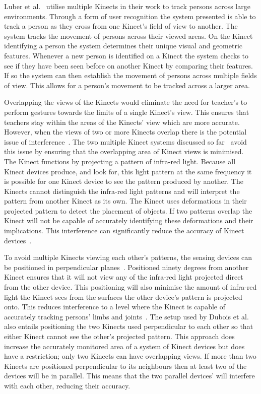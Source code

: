 \documentclass[link]{IWCOMP}
\begin{document}
Luber et al.~\cite{Luber2011} utilise multiple Kinects in their work to track persons across large environments.
Through a form of user recognition the system presented is able to track a person as they cross from one Kinect's field of view to another.
The system tracks the movement of persons across their viewed areas.
On the Kinect identifying a person the system determines their unique visual and geometric features.
Whenever a new person is identified on a Kinect the system checks to see if they have been seen before on another Kinect by comparing their features.
If so the system can then establish the movement of persons across multiple fields of view.
This allows for a person's movement to be tracked across a larger area.

Overlapping the views of the Kinects would eliminate the need for teacher's to perform gestures towards the limits of a single Kinect's view.
This ensures that teachers stay within the areas of the Kinects' view which are more accurate.
However, when the views of two or more Kinects overlap there is the potential issue of interference~\cite{Satyavolu2012}.
The two multiple Kinect systems discussed so far~\cite{Dubois2011,Luber2011} avoid this issue by ensuring that the overlapping area of Kinect views is minimised.
The Kinect functions by projecting a pattern of infra-red light.
Because all Kinect devices produce, and look for, this light pattern at the same frequency it is possible for one Kinect device to see the pattern produced by another.
The Kinects cannot distinguish the infra-red light patterns and will interpret the pattern from another Kinect as its own.
The Kinect uses deformations in their projected pattern to detect the placement of objects.
If two patterns overlap the Kinect will not be capable of accurately identifying these deformations and their implications.
This interference can significantly reduce the accuracy of Kinect devices~\cite{Satyavolu2012}.

To avoid multiple Kinects viewing each other's patterns, the sensing devices can be positioned in perpendicular planes~\cite{Caon2011,Kramer2012}.
Positioned ninety degrees from another Kinect ensures that it will not view any of the infra-red light projected direct from the other device.
This positioning will also minimise the amount of infra-red light the Kinect sees from the surfaces the other device's pattern is projected onto.
This reduces interference to a level where the Kinect is capable of accurately tracking persons' limbs and joints~\cite{Caon2011}.
The setup used by Dubois et al.~\cite{Dubois2011} also entails positioning the two Kinects used perpendicular to each other so that either Kinect cannot see the other's projected pattern.
This approach does increase the accurately monitored area of a system of Kinect devices but does have a restriction; only two Kinects can have overlapping views.
If more than two Kinects are positioned perpendicular to its neighbours then at least two of the devices will be in parallel.
This means that the two parallel devices' will interfere with each other, reducing their accuracy.
\end{document}
